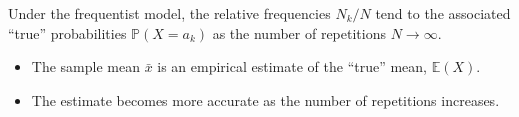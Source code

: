 \documentclass[lecture]{csm}
\newcommand{\prob}{\mathbb{P}}
\newcommand{\expe}{\mathbb{E}}
\def\it{\item}
\def\bit{\begin{itemize}}
\def\eit{\end{itemize}}
\begin{document}
Under the frequentist model, the relative frequencies $N_k/N$ tend to the associated ``true'' probabilities $\prob(X=a_k)$ as the number of repetitions $N\to\infty$.
\bit
\it The sample mean $\bar{x}$ is an empirical estimate of the ``true'' mean, $\expe(X)$.
\it The estimate becomes more accurate as the number of repetitions increases.
\eit


\end{document}
